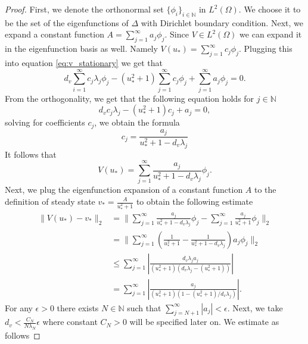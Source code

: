 \documentclass[12pt, a4paper]{article}
\theoremstyle{break}
\theoremstyle{break}
\theoremstyle{break}
\theoremstyle{break}
\theoremstyle{break}
\theoremstyle{break}
\theoremstyle{break}
\begin{document}
\begin{proof}
    First, we denote the orthonormal set $\{\phi_i\}_{i \in \mathbb{N}}$ in $L^2(\Omega)$. We choose it to be the set of the eigenfunctions of $\Delta$ with Dirichlet boundary condition. Next, 
    we expand a constant function $A = \sum_{j=1}^\infty a_j \phi_j$. Since $V \in L^2(\Omega)$ we can expand it in the eigenfunction basis as well. Namely $V(u_*) = \sum_{j=1}^\infty c_j \phi_j$. Plugging this into equation \eqref{eq:v_stationary} we get that
    \begin{equation*}
        d_v\sum_{i=1}^\infty c_j \lambda_j \phi_j - (u_*^2 + 1) \sum_{j=1}^\infty c_j \phi_j + \sum_{j=1}^\infty a_j \phi_j = 0.
    \end{equation*}
    From the orthogonality, we get that the following equation holds for $j \in \mathbb{N}$
    \begin{equation*}
        d_v c_j\lambda_j - (u_*^2+1) c_j + a_j = 0,
    \end{equation*}
    solving for coefficients $c_j$, we obtain the formula
    \begin{equation*}
        c_j = \frac{a_j}{u_*^2 + 1 - d_v\lambda_j}
    \end{equation*}
    It follows that
    \begin{equation*}
        V(u_*) = \sum_{j=1}^\infty \frac{a_j}{u_*^2 + 1 - d_v\lambda_j} \phi_j.
    \end{equation*}
    Next, we plug the eigenfunction expansion of a constant function $A$ to the definition of steady state $v_* = \frac{A}{u_*^2 + 1}$ to obtain the following estimate
    \begin{align*}
        \|V(u_*) - v_*\|_2 
        &=
        \|\sum_{j=1}^\infty \frac{a_j}{u_*^2 + 1 - d_v\lambda_j} \phi_j - \sum_{j=1}^\infty \frac{a_j}{u_*^2 + 1}\phi_j\|_2  \\
        &=
        \|\sum_{j=1}^\infty\left(\frac{1}{u_*^2+1} - \frac{1}{u_*^2+1-d_v\lambda_j} \right) a_j\phi_j\|_2  \\
        &\leq
        \sum_{j=1}^\infty\left| \frac{d_v \lambda_j a_j}{(u_*^2+1)(d_v\lambda_j - (u_*^2+1))} \right| \\
        &=
        \sum_{j=1}^\infty\left| \frac{a_j}{(u_*^2+1)(1 - (u_*^2+1) / d_v \lambda_j)} \right|.
    \end{align*}
    For any $\epsilon > 0$ there exists $N \in \mathbb{N}$ such that $\sum_{j=N+1}^\infty |a_j| < \epsilon$. Next, we take $d_v < \frac{C_N}{N \lambda_N} \epsilon$ where constant $C_N >0$ will be specified later on. We estimate as follows

\end{proof}
\end{document}
